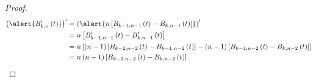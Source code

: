 \begin{frame}
    \begin{proof}
        \begin{align*}
            {\left(
                \alert{
                    B^{\prime}_{k,n}\left(t\right)
                }
                \right)}^{\prime}
             & =
            \left(
            \alert{
                n
                \left[
                B_{k-1,n-1}\left(t\right)-
                B_{k,n-1}\left(t\right)
                \right]
            }
            \right)^{\prime} \\
             & =
            n\left[
                B^{\prime}_{k-1,n-1}\left(t\right)-
                B^{\prime}_{k,n-1}\left(t\right)
            \right]          \\
             & =
            n\left[
                \left(n-1\right)
                \left[
                    B_{k-2,n-2}\left(t\right)-
                    B_{k-1,n-2}\left(t\right)
                    \right]-
                \left(n-1\right)
                \left[
                    B_{k-1,n-2}\left(t\right)-
                    B_{k,n-2}\left(t\right)
                    \right]
            \right]          \\
             & =
            n\left(n-1\right)
            \left[
                B_{k-2,n-2}\left(t\right)-
                B_{k,n-2}\left(t\right)
                \right].
        \end{align*}
    \end{proof}
\end{frame}